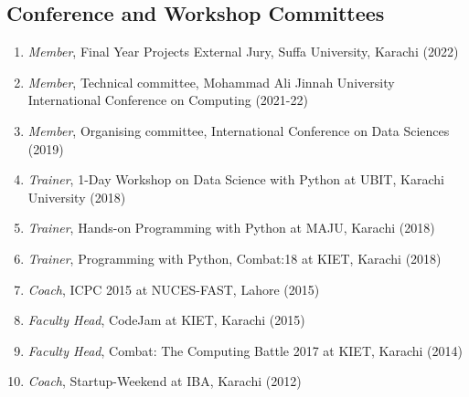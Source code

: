 \documentclass[10pt]{article}
\begin{document}
\subsection*{Conference and Workshop Committees}
\begin{enumerate}
\itemsep=-.25em
    \item \emph{Member}, Final Year Projects External Jury, Suffa University, Karachi (2022)

    \item \emph{Member}, Technical committee, Mohammad Ali Jinnah University International Conference on Computing (2021-22)
    
    \item \emph{Member}, Organising committee, International Conference on Data Sciences (2019)
    
    \item \emph{Trainer}, 1-Day Workshop on Data Science with Python at UBIT, Karachi University (2018)
    
    \item \emph{Trainer}, Hands-on Programming with Python at MAJU, Karachi (2018)
    
    \item \emph{Trainer}, Programming with Python, Combat:18 at KIET, Karachi (2018)
    
    \item \emph{Coach}, ICPC 2015 at NUCES-FAST, Lahore (2015)
    
    \item \emph{Faculty Head}, CodeJam at KIET, Karachi (2015)
    \item \emph{Faculty Head}, Combat: The Computing Battle 2017 at KIET, Karachi (2014)
    
    \item \emph{Coach}, Startup-Weekend at IBA, Karachi (2012)
\end{enumerate}
\end{document}
